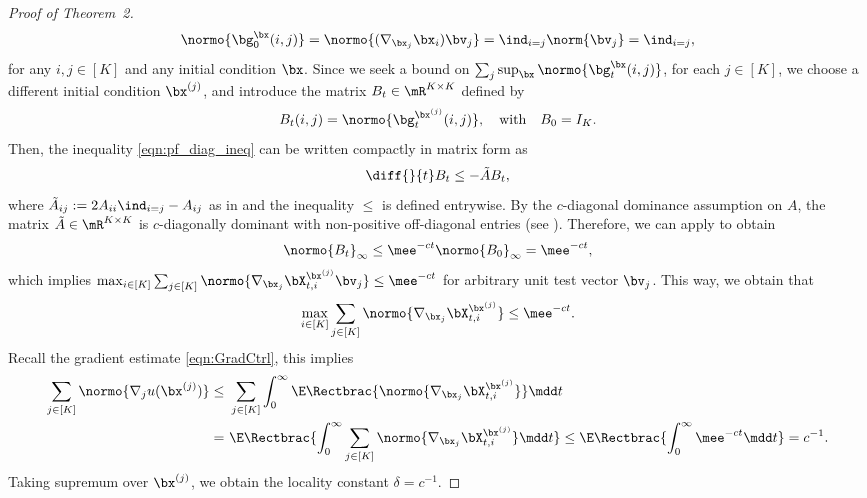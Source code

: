 \documentclass[11pt]{article}
\begin{document}
\begin{proof}[Proof of Theorem~2]
\begin{equation}
\label{eqn:pf_diag_init}
    \normo{ \bg_0^{\bx}(i,j) } =  \normo{ (\nabla_{\bx_j} \bx_i) \bv_j } = \ind_{i=j} \norm{\bv_j} = \ind_{i=j},
\end{equation}
for any $i,j \in [K]$ and any initial condition $\bx$. 
Since we seek a bound on $\sum_j \sup_{\bx} \normo{ \bg_t^\bx(i,j) }$, for each \(j\in[K]\), we choose a different initial condition $\bx^{(j)}$, and introduce the matrix $B_t \in \mR^{K\times K}$ defined by
\begin{equation}
    B_t(i,j) = \normo{ \bg_t^{\bx^{(j)}}(i,j) }, \quad \text{with} \quad B_0 = I_K.
\end{equation}
Then, the inequality \eqref{eqn:pf_diag_ineq} can be written compactly in matrix form as
\begin{equation}
    \diff{}{t} B_t \le - \tilde{A} B_t,
\end{equation}
where $\tilde{A}_{ij} := 2 A_{ii} \ind_{i=j} - A_{ij}$ as in  and the inequality $\le$ is defined entrywise.
%
By the $c$-diagonal dominance assumption on $A$, the matrix $\tilde{A} \in \mR^{K\times K}$ is $c$-diagonally dominant with non-positive off-diagonal entries (see ). Therefore, we can apply  to obtain
\begin{equation}
    \normo{B_t}_\infty \le \mee^{-c t} \normo  {B_0}_\infty = \mee^{-c t},
\end{equation}
which implies 
\(
    \max_{i\in[K]} \sum_{j \in [K]} \normo{ \nabla_{\bx_j} \bX_{t,i}^{\bx^{(j)}} \bv_j } \le \mee^{-c t}
\)
for arbitrary unit test vector $\bv_j$. This way, we obtain that
\begin{equation}
\label{eqn:pf_dXGrad2}
    \max_{i\in[K]} \sum_{j \in [K]} \normo{ \nabla_{\bx_j} \bX_{t,i}^{\bx^{(j)}} } \le \mee^{-c t}.
\end{equation}
%
Recall the gradient estimate \eqref{eqn:GradCtrl}, this implies 
\begin{equation}
\begin{split}
    \sum_{j \in [K]} \normo{ \nabla_j u(\bx^{(j)}) } \le~& \sum_{j \in [K]} \int_0^\infty \E \Rectbrac{ \normo{ \nabla_{\bx_j} \bX_{t,i}^{\bx^{(j)}} } } \mdd t \\
    =~& \E \Rectbrac{ \int_0^\infty \sum_{j \in [K]}  \normo{ \nabla_{\bx_j} \bX_{t,i}^{\bx^{(j)}} } \mdd t } \le \E  \Rectbrac{ \int_0^\infty \mee^{-c t} \mdd t } = c^{-1}.
\end{split}
\end{equation}
Taking supremum over $\bx^{(j)}$, we obtain the locality constant $\delta = c^{-1}$. 
\end{proof}
\end{document}
